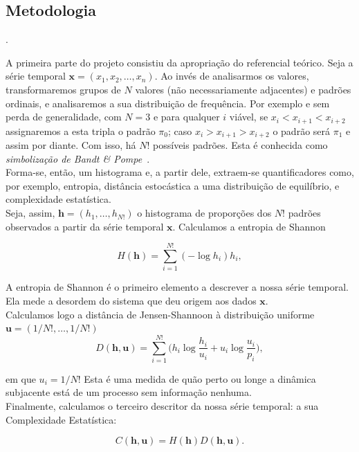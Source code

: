 \documentclass[a0,portrait]{sciposter}
\begin{document}
\begin{multicols}{2}
\section*{Metodologia}.

\quad A primeira parte do projeto consistiu da apropriação do referencial teórico.
Seja a série temporal $\bm x = (x_1, x_2, \dots, x_n)$.
Ao invés de analisarmos os valores, transformaremos grupos de $N$ valores (não necessariamente adjacentes) e padrões ordinais, e analisaremos a sua distribuição de frequência.
Por exemplo e sem perda de generalidade, com $N=3$ e para qualquer $i$ viável,
se $x_i<x_{i+1}<x_{i+2}$ assignaremos a esta tripla o padrão $\pi_0$;
caso $x_i>x_{i+1}>x_{i+2}$ o padrão será $\pi_1$ e assim por diante.
Com isso, há $N!$ possíveis padrões.
Esta é conhecida como \textit{simbolização de Bandt \& Pompe}~\cite{PermutationEntropyBandtPompe}.\\

Forma-se, então, um histograma e, a partir dele, extraem-se quantificadores como, por exemplo, entropia, distância estocástica a uma distribuição de equilíbrio, e complexidade estatística.\\

Seja, assim, $\bm h=(h_1,\dots,h_{N!})$ o histograma de proporções dos $N!$ padrões observados a partir da série temporal $\bm x$.
Calculamos a entropia de Shannon

\begin{equation}
H(\bm h) = \sum_{i=1}^{N!} (-\log h_i) h_i,
\label{eq:Entropia}
\end{equation}

A entropia de Shannon é o primeiro elemento a descrever a nossa série temporal.
Ela mede a desordem do sistema que deu origem aos dados $\bm x$.\\

Calculamos logo a distância de Jensen-Shannoon à distribuição uniforme $\bm u=(1/N!,\dots,1/N!)$
\begin{equation}
D(\bm h,\bm u) = \sum_{i=1}^{N!} \Big(h_i \log\frac{h_i}{u_i} +
u_i \log\frac{u_i}{p_i}
\Big),
\end{equation}

em que $u_i=1/N!$
Esta é uma medida de quão perto ou longe a dinâmica subjacente está de um processo sem informação nenhuma.\\

Finalmente, calculamos o terceiro descritor da nossa série temporal: a sua Complexidade Estatística:

\begin{equation}
C(\bm h, \bm u) = H(\bm h) D(\bm h, \bm u).
\end{equation}


\end{multicols}
\end{document}
